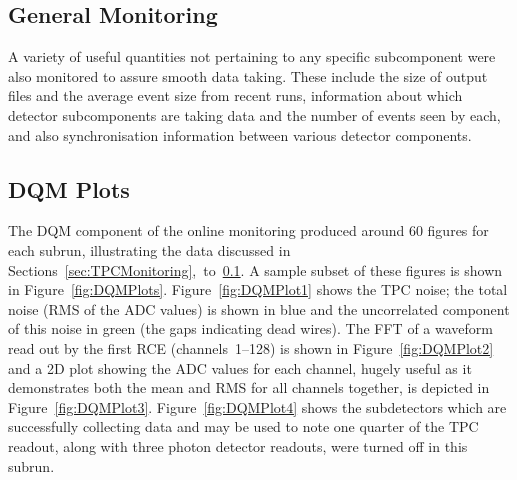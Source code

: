 \subsection{General Monitoring}\label{sec:GeneralMonitoring}

A variety of useful quantities not pertaining to any specific subcomponent were also monitored to assure smooth data taking.  These include the size of output files and the average event size from recent runs, information about which detector subcomponents are taking data and the number of events seen by each, and also synchronisation information between various detector components.

\subsection{DQM Plots}\label{sec:DQMPlots}

The DQM component of the online monitoring produced around 60 figures for each subrun, illustrating the data discussed in Sections~\ref{sec:TPCMonitoring},~to~\ref{sec:GeneralMonitoring}.  A sample subset of these figures is shown in Figure~\ref{fig:DQMPlots}.  Figure~\ref{fig:DQMPlot1} shows the TPC noise; the total noise (RMS of the ADC values) is shown in blue and the uncorrelated component of this noise in green (the gaps indicating dead wires).  The FFT of a waveform read out by the first RCE (channels~1--128) is shown in Figure~\ref{fig:DQMPlot2} and a 2D plot showing the ADC values for each channel, hugely useful as it demonstrates both the mean and RMS for all channels together, is depicted in Figure~\ref{fig:DQMPlot3}.  Figure~\ref{fig:DQMPlot4} shows the subdetectors which are successfully collecting data and may be used to note one quarter of the TPC readout, along with three photon detector readouts, were turned off in this subrun.


